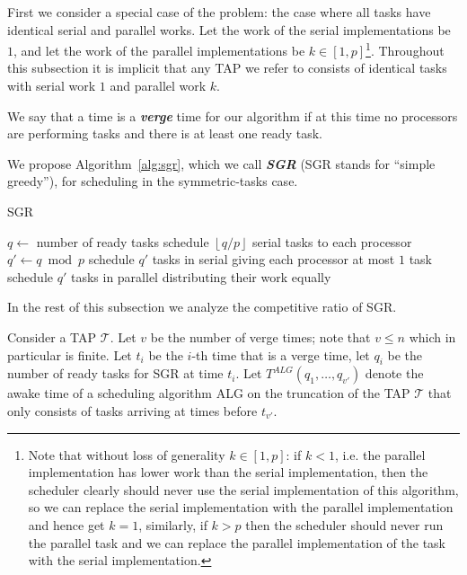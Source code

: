 \documentclass[twocolumn]{article}[10pt]
\newcommand{\defn}[1]{{\textit{\textbf{\boldmath #1}}}\xspace}
\newcommand{\floor}[1]{\left\lfloor #1 \right\rfloor}
\begin{document}
First we consider a special case of the problem: the case where
all tasks have identical serial and parallel works. Let
the work of the serial implementations be $1$, and let the work
of the parallel implementations be $k \in [1, p]$\footnote{Note that
without loss of generality $k \in [1,p]$: if $k < 1$, i.e. the
parallel implementation has lower work than the serial
implementation, then the scheduler clearly should never use the serial
implementation of this algorithm, so we can replace the serial
implementation with the parallel implementation and hence get
$k=1$, similarly, if $k > p$ then the scheduler should never run
the parallel task and we can replace the parallel implementation
of the task with the serial implementation.}. Throughout this
subsection it is implicit that any TAP we
refer to consists of identical tasks with serial work $1$ and parallel work $k$.

We say that a time is a \defn{verge} time for our algorithm if at
this time no processors are performing tasks and there is at
least one ready task.

We propose Algorithm~\ref{alg:sgr}, which we call \defn{SGR}
(SGR stands for \enquote{simple greedy}),
for scheduling in the symmetric-tasks case.

\begin{algorithm}
  \caption{SGR}
  \label{alg:sgr}
  \begin{algorithmic}
        \State $q \gets $ number of ready tasks
        \State schedule $\floor{q/p}$ serial tasks to each processor
        \State $q' \gets q\bmod p$
          \State schedule $q'$ tasks in serial
          \State giving each processor at most $1$ task
        \Else
          \State schedule $q'$ tasks in parallel
          \State distributing their work equally 
        \EndIf
      \EndIf
    \EndWhile
  \end{algorithmic}
\end{algorithm}

In the rest of this subsection we analyze the competitive ratio of SGR.

Consider a TAP $\mathcal{T}$. Let $v$ be the number of verge
times; note that $v\le n$ which in particular is finite. Let
$t_i$ be the $i$-th time that is a verge time, let $q_i$ be the
number of ready tasks for SGR at time $t_i$. Let $T^{ALG}(q_1,
\ldots, q_{v'})$ denote the awake time of a scheduling algorithm
ALG on the truncation of the TAP $\mathcal{T}$ that only consists
of tasks arriving at times before $t_{v'}$.
\end{document}
